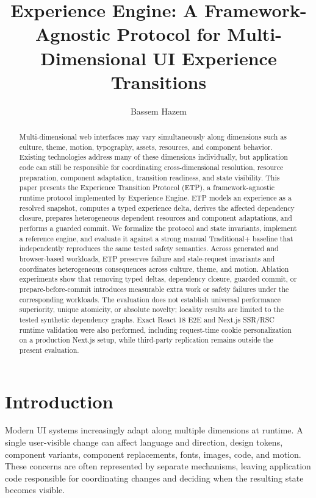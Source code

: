 \documentclass[manuscript]{acmart}
\title{Experience Engine: A Framework-Agnostic Protocol for Multi-Dimensional UI Experience Transitions}
\author{Bassem Hazem}
\affiliation{\institution{Independent Researcher}\country{Egypt}}
\begin{document}
\begin{abstract}
Multi-dimensional web interfaces may vary simultaneously along dimensions such as culture,
theme, motion, typography, assets, resources, and component behavior. Existing technologies
address many of these dimensions individually, but application code can still be responsible
for coordinating cross-dimensional resolution, resource preparation, component adaptation,
transition readiness, and state visibility. This paper presents the Experience Transition
Protocol (ETP), a framework-agnostic runtime protocol implemented by Experience Engine.
ETP models an experience as a resolved snapshot, computes a typed experience delta, derives
the affected dependency closure, prepares heterogeneous dependent resources and component
adaptations, and performs a guarded commit. We formalize the protocol and state invariants,
implement a reference engine, and evaluate it against a strong manual Traditional+ baseline
that independently reproduces the same tested safety semantics. Across generated and
browser-based workloads, ETP preserves failure and stale-request invariants and coordinates
heterogeneous consequences across culture, theme, and motion. Ablation experiments show
that removing typed deltas, dependency closure, guarded commit, or prepare-before-commit
introduces measurable extra work or safety failures under the corresponding workloads.
The evaluation does not establish universal performance superiority, unique atomicity, or
absolute novelty; locality results are limited to the tested synthetic dependency graphs.
Exact React 18 E2E and Next.js SSR/RSC runtime validation were also performed, including
request-time cookie personalization on a production Next.js setup, while third-party replication
remains outside the present evaluation.
\end{abstract}
\maketitle

\section{Introduction}
Modern UI systems increasingly adapt along multiple dimensions at runtime. A single
user-visible change can affect language and direction, design tokens, component variants,
component replacements, fonts, images, code, and motion. These concerns are often
represented by separate mechanisms, leaving application code responsible for coordinating
changes and deciding when the resulting state becomes visible.
\end{document}
